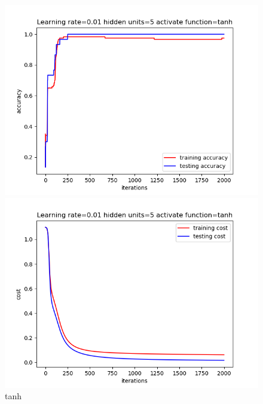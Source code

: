 \documentclass{article}
\begin{document}
\begin{figure}[htb]
\begin{minipage}[t]{0.5\linewidth}
    \includegraphics[scale=0.3]{accuracy_tanh_5.png} 
    \end{minipage}%
    \begin{minipage}[t]{0.5\linewidth} 
    \centering 
    \includegraphics[scale=0.3]{cost_tanh_5.png} 
    \end{minipage}%
    \centering 
    \caption{tanh} 
\end{figure}
\end{document}
